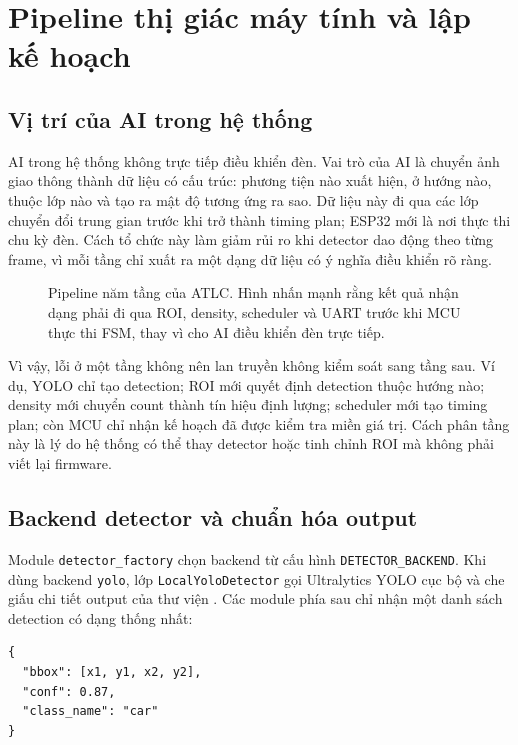 \section{Pipeline thị giác máy tính và lập kế hoạch}

\subsection{Vị trí của AI trong hệ thống}

AI trong hệ thống không trực tiếp điều khiển đèn. Vai trò của AI là chuyển ảnh giao thông thành dữ liệu có cấu trúc: phương tiện nào xuất hiện, ở hướng nào, thuộc lớp nào và tạo ra mật độ tương ứng ra sao. Dữ liệu này đi qua các lớp chuyển đổi trung gian trước khi trở thành timing plan; ESP32 mới là nơi thực thi chu kỳ đèn. Cách tổ chức này làm giảm rủi ro khi detector dao động theo từng frame, vì mỗi tầng chỉ xuất ra một dạng dữ liệu có ý nghĩa điều khiển rõ ràng.

\begin{figure}[H]
  \centering
  \caption{Pipeline năm tầng của ATLC. Hình nhấn mạnh rằng kết quả nhận dạng phải đi qua ROI, density, scheduler và UART trước khi MCU thực thi FSM, thay vì cho AI điều khiển đèn trực tiếp.}
  \label{fig:five-stage}
\end{figure}

Vì vậy, lỗi ở một tầng không nên lan truyền không kiểm soát sang tầng sau. Ví dụ, YOLO chỉ tạo detection; ROI mới quyết định detection thuộc hướng nào; density mới chuyển count thành tín hiệu định lượng; scheduler mới tạo timing plan; còn MCU chỉ nhận kế hoạch đã được kiểm tra miền giá trị. Cách phân tầng này là lý do hệ thống có thể thay detector hoặc tinh chỉnh ROI mà không phải viết lại firmware.

\subsection{Backend detector và chuẩn hóa output}

Module \texttt{detector\_factory} chọn backend từ cấu hình \texttt{DETECTOR\_BACKEND}. Khi dùng backend \texttt{yolo}, lớp \texttt{LocalYoloDetector} gọi Ultralytics YOLO cục bộ và che giấu chi tiết output của thư viện \cite{ultralytics_predict}. Các module phía sau chỉ nhận một danh sách detection có dạng thống nhất:

\begin{lstlisting}
{
  "bbox": [x1, y1, x2, y2],
  "conf": 0.87,
  "class_name": "car"
}
\end{lstlisting}


